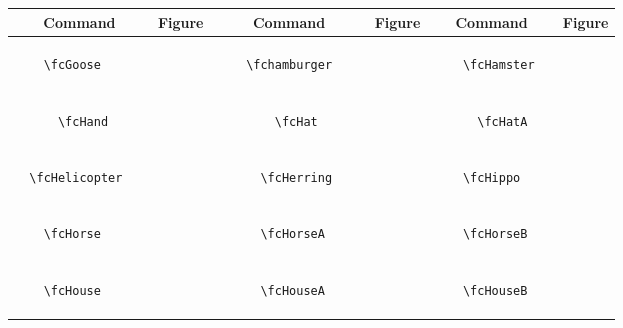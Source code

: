 \documentclass[x11names]{article}
\begin{document}
\begin{table}[H]\centering\begin{tabular}{|c|c|c|c|c|c|}\hline{\bf Command} & {\bf Figure} & {\bf Command} & {\bf Figure} & {\bf Command} & {\bf Figure}\\	\hline	&\multirow{5}{*}{	\fcGoose	[scale=0.8]} & &\multirow{5}{*}{	\fchamburger	[scale=0.4]} & &\multirow{5}{*}{	\fcHamster	[scale=0.4]}\\	& & & & & \\	& & & & & \\	\verb|	\fcGoose	| & & \verb|	\fchamburger	| & & \verb|	\fcHamster	| & \\	& & & & & \\	& & & & & \\	& & & & & \\	\hline									
		&\multirow{5}{*}{	\fcHand	[scale=0.3]} & &\multirow{5}{*}{	\fcHat	[scale=0.8]} & &\multirow{5}{*}{	\fcHatA	[scale=0.8]}\\	& & & & & \\	& & & & & \\	\verb|	\fcHand	| & & \verb|	\fcHat	| & & \verb|	\fcHatA	| & \\	& & & & & \\	& & & & & \\	& & & & & \\	\hline									
		&\multirow{5}{*}{	\fcHelicopter	[scale=0.4]} & &\multirow{5}{*}{	\fcHerring	[scale=0.4]} & &\multirow{5}{*}{	\fcHippo	[scale=0.4]}\\	& & & & & \\	& & & & & \\	\verb|	\fcHelicopter	| & & \verb|	\fcHerring	| & & \verb|	\fcHippo	| & \\	& & & & & \\	& & & & & \\	& & & & & \\	\hline									
		&\multirow{5}{*}{	\fcHorse	[scale=0.8]} & &\multirow{5}{*}{	\fcHorseA	[scale=0.3]} & &\multirow{5}{*}{	\fcHorseB	[scale=0.3]}\\	& & & & & \\	& & & & & \\	\verb|	\fcHorse	| & & \verb|	\fcHorseA	| & & \verb|	\fcHorseB	| & \\	& & & & & \\	& & & & & \\	& & & & & \\	\hline									
		&\multirow{5}{*}{	\fcHouse	[scale=0.8]} & &\multirow{5}{*}{	\fcHouseA	[scale=0.8]} & &\multirow{5}{*}{	\fcHouseB	[scale=0.4]}\\	& & & & & \\	& & & & & \\	\verb|	\fcHouse	| & & \verb|	\fcHouseA	| & & \verb|	\fcHouseB	| & \\	& & & & & \\	& & & & & \\	& & & & & \\	\hline									

\end{tabular}
\end{table}
\end{document}
